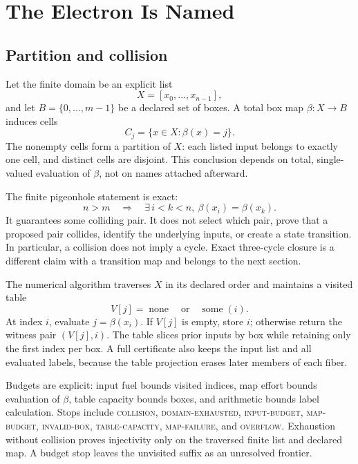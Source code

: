 \chapter{The Electron Is Named}

\section{Partition and collision}

Let the finite domain be an explicit list
\[
X=[x_0,\ldots,x_{n-1}],
\]
and let \(B=\{0,\ldots,m-1\}\) be a declared set of boxes.  A total box map
\(\beta:X\to B\) induces cells
\[
                         C_j=\{x\in X:\beta(x)=j\}.
\]
The nonempty cells form a partition of \(X\): each listed input belongs to exactly one cell, and distinct cells are
disjoint.  This conclusion depends on total, single-valued evaluation of \(\beta\), not on names attached afterward.

The finite pigeonhole statement is exact:
\[
 n>m\quad\Longrightarrow\quad
 \exists\,i<k<n,\ \beta(x_i)=\beta(x_k).
\]
It guarantees some colliding pair.  It does not select which pair, prove that a proposed pair collides, identify the
underlying inputs, or create a state transition.  In particular, a collision does not imply a cycle.  Exact
three-cycle closure is a different claim with a transition map and belongs to the next section.

The numerical algorithm traverses \(X\) in its declared order and maintains a visited table
\[
                       V[j]=\operatorname{none}
                       \quad\text{or}\quad\operatorname{some}(i).
\]
At index \(i\), evaluate \(j=\beta(x_i)\).  If \(V[j]\) is empty, store \(i\); otherwise return the witness pair
\((V[j],i)\).  The table slices prior inputs by box while retaining only the first index per box.  A full certificate
also keeps the input list and all evaluated labels, because the table projection erases later members of each fiber.

Budgets are explicit: input fuel bounds visited indices, map effort bounds evaluation of \(\beta\), table capacity
bounds boxes, and arithmetic bounds label calculation.  Stops include \textsc{collision}, \textsc{domain-exhausted},
\textsc{input-budget}, \textsc{map-budget}, \textsc{invalid-box}, \textsc{table-capacity},
\textsc{map-failure}, and \textsc{overflow}.  Exhaustion without collision proves injectivity only on the traversed
finite list and declared map.  A budget stop leaves the unvisited suffix as an unresolved frontier.

